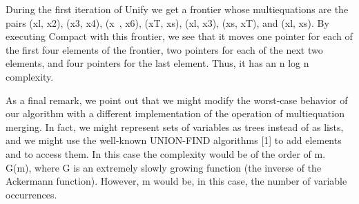 During the first iteration of Unify we get a frontier whose multiequations are
the pairs (xl, x2), (x3, x4), (x~, x6), (xT, xs), (xl, x3), (xs, xT), and (xl, xs). By
executing Compact with this frontier, we see that it moves one pointer for each
of the first four elements of the frontier, two pointers for each of the next two
elements, and four pointers for the last element. Thus, it has an n log n complexity. 

As a final remark, we point out that we might modify the worst-case behavior
of our algorithm with a different implementation of the operation of multiequation
merging. In fact, we might represent sets of variables as trees instead of as lists,
and we might use the well-known UNION-FIND algorithms [1] to add elements
and to access them. In this case the complexity would be of the order of m. G(m),
where G is an extremely slowly growing function (the inverse of the Ackermann
function). However, m would be, in this case, the number of variable occurrences.  